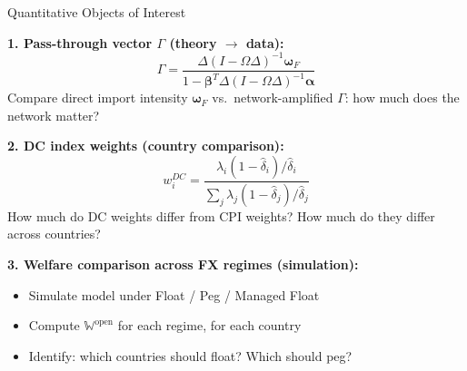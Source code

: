 \documentclass[aspectratio=169]{beamer}
\begin{document}
\begin{frame}{Quantitative Objects of Interest}

\textbf{1. Pass-through vector $\Gamma$ (theory $\to$ data):}
\begin{equation*}
    \Gamma = \frac{\Delta(I-\Omega\Delta)^{-1}\bm{\omega}_F}{1 - \bm{\beta}^T\Delta(I-\Omega\Delta)^{-1}\bm{\alpha}}
\end{equation*}
Compare direct import intensity $\bm{\omega}_F$ vs.\ network-amplified $\Gamma$: how much does the network matter?

\vspace{0.2cm}
\textbf{2. DC index weights (country comparison):}
\begin{equation*}
    w_i^{DC} = \frac{\lambda_i(1-\hat{\delta}_i)/\hat{\delta}_i}{\sum_j\lambda_j(1-\hat{\delta}_j)/\hat{\delta}_j}
\end{equation*}
How much do DC weights differ from CPI weights? How much do they differ across countries?

\vspace{0.2cm}
\textbf{3. Welfare comparison across FX regimes (simulation):}
\begin{itemize}
    \item Simulate model under Float / Peg / Managed Float
    \item Compute $\mathbb{W}^{\text{open}}$ for each regime, for each country
    \item Identify: which countries should float? Which should peg?
\end{itemize}
\end{frame}
\end{document}
